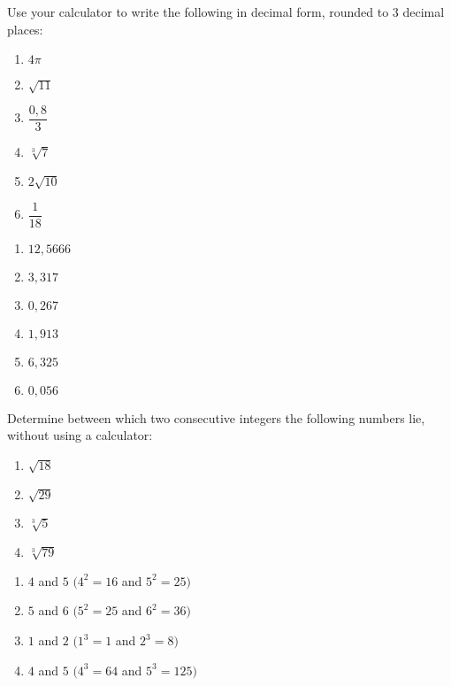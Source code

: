 \begin{exercises}{}
{
Use your calculator to write the following in decimal form, rounded to $3$ decimal places:
\begin{enumerate}[itemsep=5pt, label=\textbf{\arabic*}. ]
 \item $4\pi$
\item $\sqrt{11}$
\item $\dfrac{0,8}{3}$
\item $\sqrt[3]{7}$
\item $2\sqrt{10}$
\item $\dfrac{1}{18}$
\end{enumerate}

}
\end{exercises}


 \begin{solutions}{}{
\begin{enumerate}[itemsep=5pt, label=\textbf{\arabic*}. ] 
 \item $12,5666$%
\item $3,317$%
\item $0,267$%
\item $1,913$
\item $6,325$%
\item $0,056$%
\end{enumerate}}
\end{solutions}


\begin{exercises}{}
 {
Determine between which two consecutive integers the following numbers lie, without using a calculator:
\begin{enumerate}[itemsep=5pt, label=\textbf{\arabic*}. ]
\item $\sqrt{18}$
\item $\sqrt{29}$
\item $\sqrt[3]{5}$
\item $\sqrt[3]{79}$
\end{enumerate}

}
\end{exercises}

 \begin{solutions}{}{
\begin{enumerate}[noitemsep, label=\textbf{\arabic*}. ]
\item $4$ and $5$ $(4^2 = 16$ and $5^2=25)$%
\item $5$ and $6$ $(5^2 = 25$ and $6^2=36)$%
\item $1$ and $2$ $(1^3 = 1$ and $2^3=8)$%
\item $4$ and $5$ $(4^3 = 64$ and $5^3=125)$%
\end{enumerate}
}
\end{solutions}


